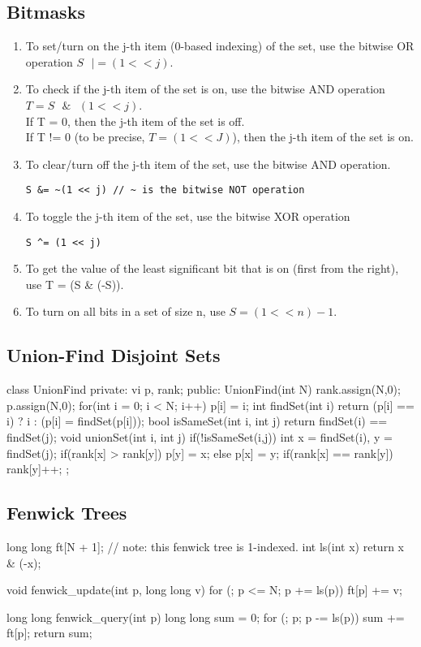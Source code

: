 \documentclass{article}
\begin{document}
\subsection{Bitmasks}
\begin{enumerate}
\item To set/turn on the j-th item (0-based indexing) of the set, use the bitwise OR operation $S\text{ }|= (1 << j)$.
\item To check if the j-th item of the set is on, use the bitwise AND operation $T = S\text{ }\&\text{ }(1 << j)$.\\
If T = 0, then the j-th item of the set is off.\\
If T != 0 (to be precise, $T = (1<<J)$), then the j-th item of the set is on.
\item To clear/turn off the j-th item of the set, use the bitwise AND operation.
\begin{lstlisting}
S &= ~(1 << j) // ~ is the bitwise NOT operation
\end{lstlisting}
\item To toggle the j-th item of the set, use the bitwise XOR operation
\begin{lstlisting}
S ^= (1 << j)
\end{lstlisting}
\item To get the value of the least significant bit that is on (first from the right), use T = (S \& (-S)).
\item To turn on all bits in a set of size n, use $S = (1 << n ) - 1$.
\end{enumerate}

\subsection{Union-Find Disjoint Sets}
\begin{mylisting}{}
class UnionFind{
	private: vi p, rank;
	public:
		UnionFind(int N) {
			rank.assign(N,0); p.assign(N,0);
			for(int i = 0; i < N; i++) p[i] = i;
		}
		int findSet(int i){
			return (p[i] == i) ? i : (p[i] = findSet(p[i]));
		}
		bool isSameSet(int i, int j){
			return findSet(i) == findSet(j);
		}
		void unionSet(int i, int j){
			if(!isSameSet(i,j)){
				int x = findSet(i), y = findSet(j);
				if(rank[x] > rank[y]) p[y] = x;
	    		else{
					p[x] = y;
					if(rank[x] == rank[y]) rank[y]++;
}}}};
\end{mylisting}

\subsection{Fenwick Trees}
\begin{mylisting}{}
long long ft[N + 1]; // note: this fenwick tree is 1-indexed.
int ls(int x) { return x & (-x); }

void fenwick_update(int p, long long v){
	for (; p <= N; p += ls(p)) ft[p] += v;
}

long long fenwick_query(int p){
	long long sum = 0;
	for (; p; p -= ls(p)) sum += ft[p];
	return sum;
}
\end{mylisting}
\end{document}

